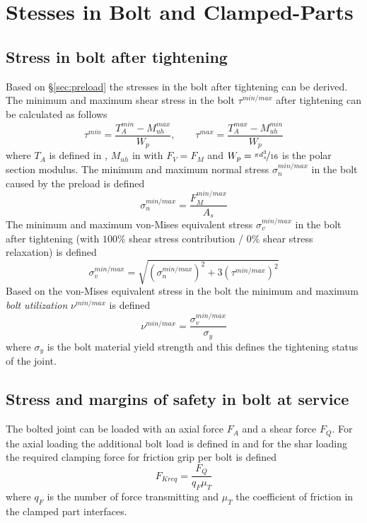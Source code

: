 \section{Stesses in Bolt and Clamped-Parts}
\subsection{Stress in bolt after tightening}
Based on §\ref{sec:preload} the stresses in the bolt after tightening can be derived. 
The minimum and maximum shear stress in the bolt $\tau^{min/max}$ after tightening can be calculated
as follows
\begin{equation}
  \tau^{min} = \frac{T_A^{min}-M_{uh}^{max}}{W_p} , \qquad \tau^{max} = \frac{T_A^{max}-M_{uh}^{min}}{W_p}
\end{equation}
where $T_A$ is defined in , $M_{uh}$ in  with $F_V=F_M$ and 
$W_p = \nicefrac{\pi d_s^3}{16}$ is the polar section modulus. The minimum and maximum normal 
stress $\sigma_n^{min/max}$ in the bolt caused by the preload is defined
\begin{equation}
  \sigma_n^{min/max} = \frac{F_M^{min/max}}{A_s}
\end{equation}
The minimum and maximum von-Mises equivalent stress $\sigma_v^{min/max}$ in the bolt after tightening
(with $100\%$ shear stress contribution / $0\%$ shear stress relaxation) is defined 
\begin{equation}
  \sigma_v^{min/max} = \sqrt{\left(\sigma_n^{min/max}\right)^2 + 3\left(\tau^{min/max}\right)^2}
\end{equation}
Based on the von-Mises equivalent stress in the bolt the minimum and maximum 
\emph{bolt utilization} $\nu^{min/max}$ is defined
\begin{equation}
  \nu^{min/max} = \frac{\sigma_v^{min/max}}{\sigma_y}
\end{equation}
where $\sigma_y$ is the bolt material yield strength and this defines the tightening status of the joint. 

\subsection{Stress and margins of safety in bolt at service}
The bolted joint can be loaded with an axial force $F_A$ and a shear force $F_Q$. For
the axial loading the additional bolt load is defined in  and for the shar loading
the required clamping force for friction grip per bolt is defined 
\begin{equation}
  F_{Kreq} = \frac{F_Q}{q_F \mu_T}
\end{equation}
where $q_F$ is the number of force transmitting and $\mu_T$ the coefficient of friction in the clamped
part interfaces. 
